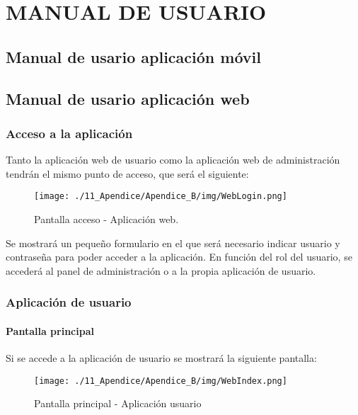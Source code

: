 \chapter[Manual de usuario]{
  \label{chp:manualdeusuario}
  MANUAL DE USUARIO
}
\thispagestyle{numberingStyle}
\pagestyle{numberingStyle}


\section{Manual de usario aplicación móvil}

\section{Manual de usario aplicación web}

\subsection{Acceso a la aplicación}

Tanto la aplicación web de usuario como la aplicación web de administración tendrán el mismo punto de acceso, que será el siguiente:

\begin{figure}[H]
\centering
\texttt{[image: ./11\_Apendice/Apendice\_B/img/WebLogin.png]}
\caption{Pantalla acceso - Aplicación web.}
\end{figure}

Se mostrará un pequeño formulario en el que será necesario indicar usuario y contraseña para poder acceder a la aplicación. En función del rol del usuario, se accederá al panel de administración o a la propia aplicación de usuario. 

\subsection{Aplicación de usuario}

\subsubsection*{Pantalla principal}
Si se accede a la aplicación de usuario se mostrará la siguiente pantalla:

\begin{figure}[H]
\centering
\texttt{[image: ./11\_Apendice/Apendice\_B/img/WebIndex.png]}
\caption{Pantalla principal - Aplicación usuario}
\end{figure}


